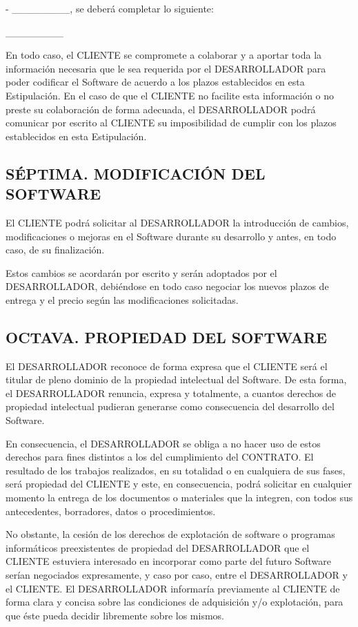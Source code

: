 \documentclass[a4paper,11pt]{report}
\begin{document}
	- \_\_\_\_\_\_\_\_, se deberá completar lo siguiente:

	\_\_\_\_\_\_\_\_

	En todo caso, el CLIENTE se compromete a colaborar y a aportar toda la
	información necesaria que le sea requerida por el DESARROLLADOR para
	poder codificar el Software de acuerdo a los plazos establecidos en esta
	Estipulación. En el caso de que el CLIENTE no facilite esta información
	o no preste su colaboración de forma adecuada, el DESARROLLADOR podrá
	comunicar por escrito al CLIENTE su imposibilidad de cumplir con los
	plazos establecidos en esta Estipulación.

	\subsection*{SÉPTIMA. MODIFICACIÓN DEL SOFTWARE}

	El CLIENTE podrá solicitar al DESARROLLADOR la introducción de cambios,
	modificaciones o mejoras en el Software durante su desarrollo y antes,
	en todo caso, de su finalización.

	Estos cambios se acordarán por escrito y serán adoptados por el
	DESARROLLADOR, debiéndose en todo caso negociar los nuevos plazos de
	entrega y el precio según las modificaciones solicitadas.

	\subsection*{OCTAVA. PROPIEDAD DEL SOFTWARE}

	El DESARROLLADOR reconoce de forma expresa que el CLIENTE será el
	titular de pleno dominio de la propiedad intelectual del Software. De
	esta forma, el DESARROLLADOR renuncia, expresa y totalmente, a cuantos
	derechos de propiedad intelectual pudieran generarse como consecuencia
	del desarrollo del Software.

	En consecuencia, el DESARROLLADOR se obliga a no hacer uso de estos
	derechos para fines distintos a los del cumplimiento del CONTRATO. El
	resultado de los trabajos realizados, en su totalidad o en cualquiera de
	sus fases, será propiedad del CLIENTE y este, en consecuencia, podrá
	solicitar en cualquier momento la entrega de los documentos o materiales
	que la integren, con todos sus antecedentes, borradores, datos o
	procedimientos.

	No obstante, la cesión de los derechos de explotación de software o
	programas informáticos preexistentes de propiedad del DESARROLLADOR que
	el CLIENTE estuviera interesado en incorporar como parte del futuro
	Software serían negociados expresamente, y caso por caso, entre el
	DESARROLLADOR y el CLIENTE. El DESARROLLADOR informaría previamente al
	CLIENTE de forma clara y concisa sobre las condiciones de adquisición
	y/o explotación, para que éste pueda decidir libremente sobre los
	mismos.
\end{document}
